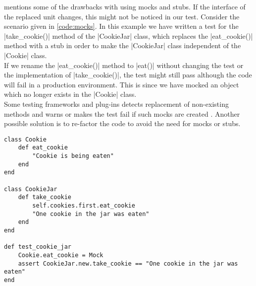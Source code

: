 \citet{video:boundaries} mentions some of the drawbacks with using mocks
and stubs. If the interface of the replaced unit changes, this might not
be noticed in our test. Consider the scenario given in \ref{code:mocks}.
In this example we have written a test for the |take_cookie()| method of
the |CookieJar| class, which replaces the |eat_cookie()| method with a
stub in order to make the |CookieJar| class independent of the |Cookie|
class.\\

If we rename the |eat_cookie()| method to |eat()| without changing the
test or the implementation of |take_cookie()|, the test might still pass
although the code will fail in a production environment. This is since
we have mocked an object which no longer exists in the |Cookie| class.\\

Some testing frameworks and plug-ins detects replacement of non-existing
methods and warns or makes the test fail if such mocks are created
\cite{video:boundaries}. Another possible solution is to re-factor the
code to avoid the need for mocks or stubs.\\

\begin{lstlisting}[caption=Example of how mocking might make tests pass
                           even when they are not indented to,
                   label=code:mocks, float=t]
class Cookie
    def eat_cookie
        "Cookie is being eaten"
    end
end

class CookieJar
    def take_cookie
        self.cookies.first.eat_cookie
        "One cookie in the jar was eaten"
    end
end

def test_cookie_jar
    Cookie.eat_cookie = Mock
    assert CookieJar.new.take_cookie == "One cookie in the jar was eaten"
end
\end{lstlisting}



